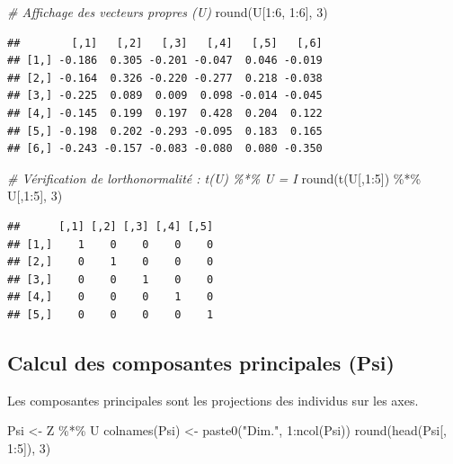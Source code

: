 \documentclass[
]{article}
\newenvironment{Shaded}{\begin{snugshade}}{\end{snugshade}}
\newcommand{\CommentTok}[1]{\textcolor[rgb]{0.56,0.35,0.01}{\textit{#1}}}
\newcommand{\DecValTok}[1]{\textcolor[rgb]{0.00,0.00,0.81}{#1}}
\newcommand{\FunctionTok}[1]{\textcolor[rgb]{0.00,0.00,0.00}{#1}}
\newcommand{\NormalTok}[1]{#1}
\newcommand{\OtherTok}[1]{\textcolor[rgb]{0.56,0.35,0.01}{#1}}
\newcommand{\SpecialCharTok}[1]{\textcolor[rgb]{0.00,0.00,0.00}{#1}}
\newcommand{\StringTok}[1]{\textcolor[rgb]{0.31,0.60,0.02}{#1}}
\begin{document}
\begin{Shaded}
\begin{Highlighting}[]
\CommentTok{\# Affichage des vecteurs propres (U)}
\FunctionTok{round}\NormalTok{(U[}\DecValTok{1}\SpecialCharTok{:}\DecValTok{6}\NormalTok{, }\DecValTok{1}\SpecialCharTok{:}\DecValTok{6}\NormalTok{], }\DecValTok{3}\NormalTok{)}
\end{Highlighting}
\end{Shaded}

\begin{verbatim}
##        [,1]   [,2]   [,3]   [,4]   [,5]   [,6]
## [1,] -0.186  0.305 -0.201 -0.047  0.046 -0.019
## [2,] -0.164  0.326 -0.220 -0.277  0.218 -0.038
## [3,] -0.225  0.089  0.009  0.098 -0.014 -0.045
## [4,] -0.145  0.199  0.197  0.428  0.204  0.122
## [5,] -0.198  0.202 -0.293 -0.095  0.183  0.165
## [6,] -0.243 -0.157 -0.083 -0.080  0.080 -0.350
\end{verbatim}

\begin{Shaded}
\begin{Highlighting}[]
\CommentTok{\# Vérification de l\textquotesingle{}orthonormalité : t(U) \%*\% U = I}
\FunctionTok{round}\NormalTok{(}\FunctionTok{t}\NormalTok{(U[,}\DecValTok{1}\SpecialCharTok{:}\DecValTok{5}\NormalTok{]) }\SpecialCharTok{\%*\%}\NormalTok{ U[,}\DecValTok{1}\SpecialCharTok{:}\DecValTok{5}\NormalTok{], }\DecValTok{3}\NormalTok{)}
\end{Highlighting}
\end{Shaded}

\begin{verbatim}
##      [,1] [,2] [,3] [,4] [,5]
## [1,]    1    0    0    0    0
## [2,]    0    1    0    0    0
## [3,]    0    0    1    0    0
## [4,]    0    0    0    1    0
## [5,]    0    0    0    0    1
\end{verbatim}

\hypertarget{calcul-des-composantes-principales-psi}{%
\subsection{Calcul des composantes principales
(Psi)}\label{calcul-des-composantes-principales-psi}}

Les composantes principales sont les projections des individus sur les
axes.

\begin{Shaded}
\begin{Highlighting}[]
\NormalTok{Psi }\OtherTok{\textless{}{-}}\NormalTok{ Z }\SpecialCharTok{\%*\%}\NormalTok{ U}
\FunctionTok{colnames}\NormalTok{(Psi) }\OtherTok{\textless{}{-}} \FunctionTok{paste0}\NormalTok{(}\StringTok{"Dim."}\NormalTok{, }\DecValTok{1}\SpecialCharTok{:}\FunctionTok{ncol}\NormalTok{(Psi))}
\FunctionTok{round}\NormalTok{(}\FunctionTok{head}\NormalTok{(Psi[, }\DecValTok{1}\SpecialCharTok{:}\DecValTok{5}\NormalTok{]), }\DecValTok{3}\NormalTok{)}
\end{Highlighting}
\end{Shaded}
\end{document}
